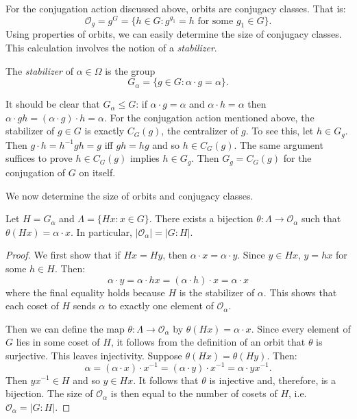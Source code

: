 \documentclass[main.tex]{subfiles}
\begin{document}
For the conjugation action discussed above, orbits are conjugacy classes. That is:
$$\mathcal{O}_g = g^G = \{h \in G : g^{g_1} = h \text{ for some } g_1 \in G \} \text{.}$$
 Using properties of orbits, we can easily determine the size of conjugacy classes. This calculation involves the notion of a \emph{stabilizer}.

\begin{definition}
The \emph{stabilizer} of $\alpha \in \Omega$ is the group 
$$G_\alpha = \{g \in G : \alpha \cdot g = \alpha \} \text{.}$$
\end{definition}

It should be clear that $G_\alpha \le G$: if $\alpha \cdot g = \alpha$ and $\alpha \cdot h = \alpha$ then $\alpha \cdot gh = (\alpha \cdot g) \cdot h = \alpha$. For the conjugation action mentioned above, the stabilizer of $g \in G$ is exactly $C_G(g)$, the centralizer of $g$. To see this, let $h \in G_g$. Then $g \cdot h = h^{-1} g h = g$ iff $gh = hg$ and so $h \in C_G(g)$. The same argument suffices to prove $h \in C_G(g)$ implies $h \in G_g$. Then $G_g = C_G(g)$ for the conjugation of $G$ on itself.

We now determine the size of orbits and conjugacy classes.

\begin{theorem}
Let $H = G_\alpha$ and $\Lambda = \{H x : x \in G\}$. There exists a bijection $\theta : \Lambda \to \mathcal{O}_\alpha$ such that $\theta(H x) = \alpha \cdot x$. In particular,
$|\mathcal{O}_\alpha| = |G : H|$.
\end{theorem}

\begin{proof}
We first show that if $H x = H y$, then $\alpha \cdot x = \alpha \cdot y$. Since $y \in Hx$, $y = h x$ for some $h \in H$. Then:
$$\alpha \cdot y = \alpha \cdot h x = (\alpha \cdot h) \cdot x = \alpha \cdot x$$
where the final equality holds because $H$ is the stabilizer of $\alpha$. This shows that each coset of $H$ sends $\alpha$ to exactly one element of $\mathcal{O}_\alpha$.

Then we can define the map $\theta: \Lambda \to \mathcal{O}_\alpha$ by $\theta(H x) = \alpha \cdot x$. Since every element of $G$ lies in some coset of $H$, it follows from the definition of an orbit that $\theta$ is surjective. This leaves injectivity. Suppose $\theta(H x) = \theta(H y)$. Then:
$$ \alpha = (\alpha \cdot x ) \cdot x^{-1} = (\alpha \cdot y) \cdot x^{-1} = \alpha \cdot y x^{-1} \text{.}$$
Then $y x^{-1} \in H$ and so $y \in Hx$. It follows that $\theta$ is injective and, therefore, is a bijection. The size of $\mathcal{O}_\alpha$ is then equal to the number of cosets of $H$, i.e. $\mathcal{O}_\alpha = |G : H|$.

\end{proof}
\end{document}
